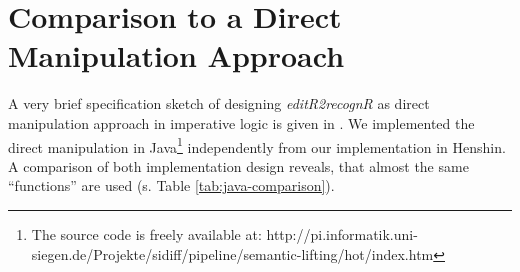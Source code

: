 \documentclass{llncs}
\begin{document}
% 
% 
% 
%  
% 
%  
%  


\section{Comparison to a Direct Manipulation Approach}
\label{sec:java-comparison}
A very brief specification sketch of designing \textit{editR2recognR} as 
direct manipulation approach in imperative logic \cite{CzH2006IBM} is 
given in \cite{KeKT2011ASE}. We implemented the direct manipulation in 
Java\footnote{The source code is freely available at: http://pi.informatik.uni-siegen.de/Projekte/sidiff/pipeline/semantic-lifting/hot/index.htm}
independently from our implementation in Henshin.
A comparison of both implementation design reveals, that
almost the same ``functions'' are used (s. Table \ref{tab:java-comparison}). 
\end{document}

